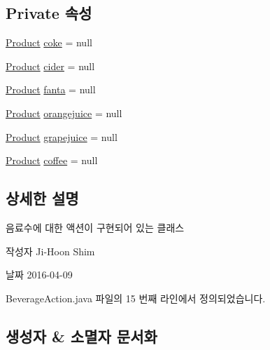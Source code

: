 \subsection*{Private 속성}
\begin{DoxyCompactItemize}
\item 
\hyperlink{class_vending_machine_1_1_product}{Product} \hyperlink{class_vending_machine_1_1_beverage_action_a3ccaf8736a20aea9cc84aa5c525fca35}{coke} = null
\item 
\hyperlink{class_vending_machine_1_1_product}{Product} \hyperlink{class_vending_machine_1_1_beverage_action_a7d3d1173a06502e63ec77d8297f7eaca}{cider} = null
\item 
\hyperlink{class_vending_machine_1_1_product}{Product} \hyperlink{class_vending_machine_1_1_beverage_action_a49ca1e1fc03f8d685e11e66734e3a29e}{fanta} = null
\item 
\hyperlink{class_vending_machine_1_1_product}{Product} \hyperlink{class_vending_machine_1_1_beverage_action_aecab78a26d86ba8dd679e5dda12ccc89}{orangejuice} = null
\item 
\hyperlink{class_vending_machine_1_1_product}{Product} \hyperlink{class_vending_machine_1_1_beverage_action_ad57bdbeb988807b0fb47fd148352930c}{grapejuice} = null
\item 
\hyperlink{class_vending_machine_1_1_product}{Product} \hyperlink{class_vending_machine_1_1_beverage_action_aa109f67c225357d2ab44e3b1cb6be6e8}{coffee} = null
\end{DoxyCompactItemize}


\subsection{상세한 설명}
음료수에 대한 액션이 구현되어 있는 클래스 

\begin{DoxyAuthor}{작성자}
Ji-\/\+Hoon Shim 
\end{DoxyAuthor}
\begin{DoxyDate}{날짜}
2016-\/04-\/09 
\end{DoxyDate}


Beverage\+Action.\+java 파일의 15 번째 라인에서 정의되었습니다.



\subsection{생성자 \& 소멸자 문서화}

